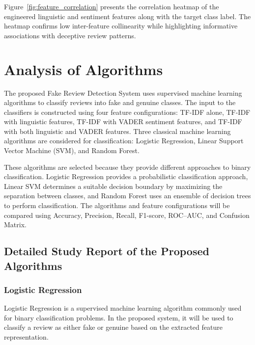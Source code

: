 \documentclass[12pt,a4paper]{report}
\begin{document}
Figure~\ref{fig:feature_correlation} presents the correlation heatmap of the engineered linguistic and sentiment features along with the target class label. The heatmap confirms low inter-feature collinearity while highlighting informative associations with deceptive review patterns.


\section{Analysis of Algorithms}

The proposed Fake Review Detection System uses supervised machine learning algorithms to classify reviews into fake and genuine classes. The input to the classifiers is constructed using four feature configurations: TF-IDF alone, TF-IDF with linguistic features, TF-IDF with VADER sentiment features, and TF-IDF with both linguistic and VADER features. Three classical machine learning algorithms are considered for classification: Logistic Regression, Linear Support Vector Machine (SVM), and Random Forest.

These algorithms are selected because they provide different approaches to binary classification. Logistic Regression provides a probabilistic classification approach, Linear SVM determines a suitable decision boundary by maximizing the separation between classes, and Random Forest uses an ensemble of decision trees to perform classification. The algorithms and feature configurations will be compared using Accuracy, Precision, Recall, F1-score, ROC--AUC, and Confusion Matrix.

\subsection{Detailed Study Report of the Proposed Algorithms}

\subsubsection*{Logistic Regression}

Logistic Regression is a supervised machine learning algorithm commonly used for binary classification problems. In the proposed system, it will be used to classify a review as either fake or genuine based on the extracted feature representation.
\end{document}
